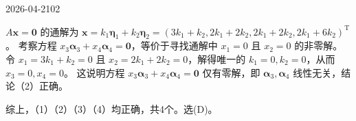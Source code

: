 \begin{mistake}{2026-04-21}{02}
\begin{solutioncontent}
\(A\boldsymbol{x}=\boldsymbol{0}\) 的通解为 \(\boldsymbol{x} = k_1\boldsymbol{\eta}_1 + k_2\boldsymbol{\eta}_2 = (3k_1+k_2, 2k_1+2k_2, 2k_1+2k_2, 2k_1+6k_2)^\mathrm{T}\)。
考察方程 \(x_3\boldsymbol{\alpha}_3 + x_4\boldsymbol{\alpha}_4 = \boldsymbol{0}\)，等价于寻找通解中 \(x_1=0\) 且 \(x_2=0\) 的非零解。
令 \(x_1 = 3k_1+k_2=0\) 且 \(x_2 = 2k_1+2k_2=0\)，解得唯一的 \(k_1=0, k_2=0\)，从而 \(x_3=0, x_4=0\)。
这说明方程 \(x_3\boldsymbol{\alpha}_3 + x_4\boldsymbol{\alpha}_4 = \boldsymbol{0}\) 仅有零解，即 \(\boldsymbol{\alpha}_3, \boldsymbol{\alpha}_4\) 线性无关，结论（2）正确。

综上，（1）（2）（3）（4）均正确，共4个。选(D)。
\end{solutioncontent}


\end{mistake}

